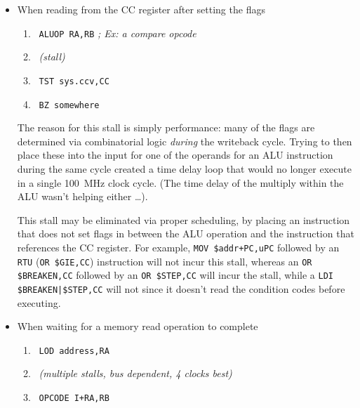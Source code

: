 \documentclass{gqtekspec}
\begin{document}
\begin{itemize}
\item When reading from the CC register after setting the flags
\begin{enumerate}
\item\ {\tt ALUOP RA,RB} {\em ; Ex: a compare opcode}
\item\ {\em (stall)}
\item\ {\tt TST sys.ccv,CC}
\item\ {\tt BZ somewhere}
\end{enumerate}

The reason for this stall is simply performance: many of the flags are
determined via combinatorial logic {\em during} the writeback cycle.
Trying to then place these into the input for one of the operands for an
ALU instruction during the same cycle
created a time delay loop that would no longer execute in a single 100~MHz
clock cycle.  (The time delay of the multiply within the ALU wasn't helping
either \ldots). 

This stall may be eliminated via proper scheduling, by placing an instruction
that does not set flags in between the ALU operation and the instruction
that references the CC register.  For example, {\tt MOV \$addr+PC,uPC}
followed by an {\tt RTU} ({\tt OR \$GIE,CC}) instruction will not incur
this stall, whereas an {\tt OR \$BREAKEN,CC} followed by an {\tt OR \$STEP,CC}
will incur the stall, while a {\tt LDI \$BREAKEN|\$STEP,CC} will not since
it doesn't read the condition codes before executing.

\item When waiting for a memory read operation to complete
\begin{enumerate}
\item\ {\tt LOD address,RA}
\item\ {\em (multiple stalls, bus dependent, 4 clocks best)}
\item\ {\tt OPCODE I+RA,RB}
\end{enumerate}


\end{itemize}
\end{document}
